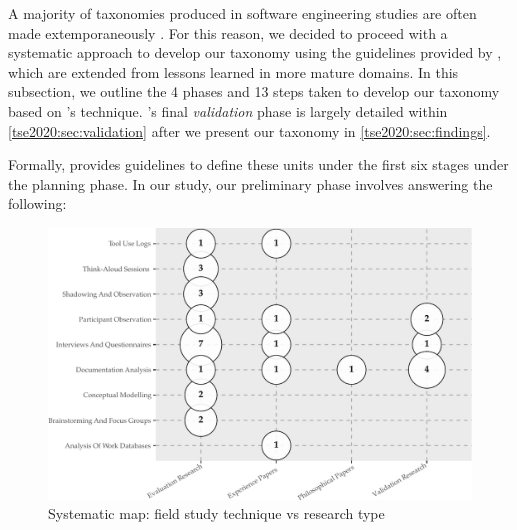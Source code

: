 A majority of taxonomies produced in software engineering studies are often made extemporaneously \citep{Usman:2017hn}. For this reason, we decided to proceed with a systematic approach to develop our taxonomy using the guidelines provided by \citet{Usman:2017hn}, which are extended from lessons learned in more mature domains. In this subsection, we outline the 4 phases and 13 steps taken to develop our taxonomy based on \citeauthor{Usman:2017hn}'s technique. \citeauthor{Usman:2017hn}'s final \textit{validation} phase is largely detailed within \cref{tse2020:sec:validation} after we present our taxonomy in \cref{tse2020:sec:findings}.


Formally, \citeauthor{Usman:2017hn} provides guidelines to define these units under the first six stages under the planning phase. In our study, our preliminary phase involves answering the following:

\begin{figure}[t!]
  \centering
  \includegraphics[width=\linewidth]{sms}
  \caption[A systematic map of API documentation studies]{Systematic map: field study technique vs research type}
  \label{tse2020:fig:sms}
\end{figure}


